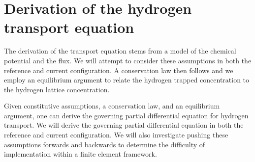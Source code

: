 \documentclass[10pt]{elsarticle}
\begin{document}
\section{Derivation of the hydrogen transport equation}
The derivation of the transport equation stems from a model of the chemical potential and the flux. We will attempt to consider these assumptions in both the reference and current configuration. A conservation law then follows and we employ an equilibrium argument to relate the hydrogen trapped concentration to the hydrogen lattice concentration.

Given constitutive assumptions, a conservation law, and an equilibrium argument, one can derive the governing partial differential equation for hydrogen transport. We will derive the governing partial differential equation in both the reference and current configuration. We will also investigate pushing these assumptions forwards and backwards to determine the difficulty of implementation within a finite element framework.
\end{document}
